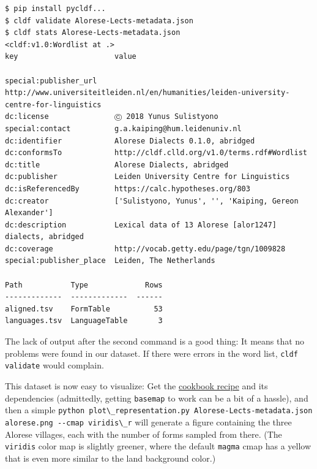 \documentclass[
  a4paper,
  14pt,
  oneside,
  tablecaptionabove
]{scrbook}
\newcommand{\passthrough}[1]{#1}
\begin{document}
\begin{lstlisting}
$ pip install pycldf...
$ cldf validate Alorese-Lects-metadata.json
$ cldf stats Alorese-Lects-metadata.json
<cldf:v1.0:Wordlist at .>
key                      value

special:publisher_url    http://www.universiteitleiden.nl/en/humanities/leiden-university-centre-for-linguistics
dc:license               Ⓒ 2018 Yunus Sulistyono
special:contact          g.a.kaiping@hum.leidenuniv.nl
dc:identifier            Alorese Dialects 0.1.0, abridged
dc:conformsTo            http://cldf.clld.org/v1.0/terms.rdf#Wordlist
dc:title                 Alorese Dialects, abridged
dc:publisher             Leiden University Centre for Linguistics
dc:isReferencedBy        https://calc.hypotheses.org/803
dc:creator               ['Sulistyono, Yunus', '', 'Kaiping, Gereon Alexander']
dc:description           Lexical data of 13 Alorese [alor1247] dialects, abridged
dc:coverage              http://vocab.getty.edu/page/tgn/1009828
special:publisher_place  Leiden, The Netherlands

Path           Type             Rows
-------------  -------------  ------
aligned.tsv    FormTable          53
languages.tsv  LanguageTable       3
\end{lstlisting}

The lack of output after the second command is a good thing: It means
that no problems were found in our dataset. If there were errors in the
word list, \passthrough{\lstinline!cldf validate!} would complain.

This dataset is now easy to visualize: Get the
\href{https://github.com/cldf/cookbook/tree/master/recipes/plot_representation}{cookbook
recipe} and its dependencies (admittedly, getting
\passthrough{\lstinline!basemap!} to work can be a bit of a hassle), and
then a simple
\passthrough{\lstinline!python plot\_representation.py Alorese-Lects-metadata.json alorese.png --cmap viridis\_r!}
will generate a figure containing the three Alorese villages, each with
the number of forms sampled from there. (The
\passthrough{\lstinline!viridis!} color map is slightly greener, where
the default \passthrough{\lstinline!magma!} cmap has a yellow that is
even more similar to the land background color.)
\end{document}
